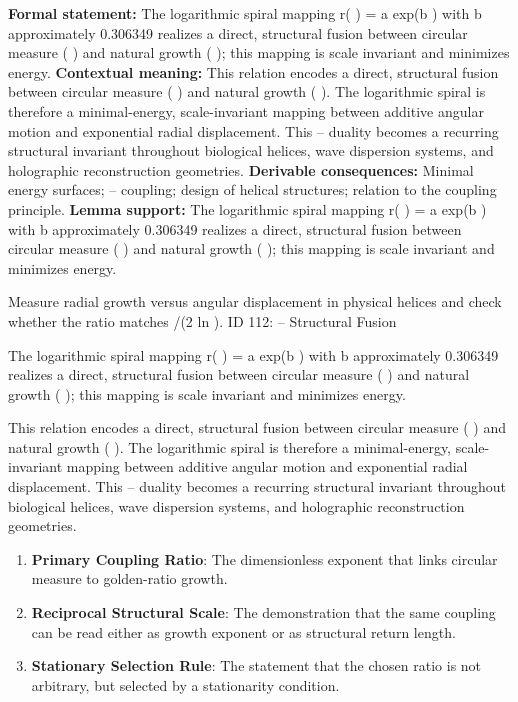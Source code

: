 \begingroup\footnotesize\setlength{\emergencystretch}{3em}\sloppy
\textbf{Formal statement:} The logarithmic spiral mapping r( ) = a exp(b  ) with b approximately 0.306349  realizes a direct, structural fusion between circular measure ( ) and natural growth ( ); this mapping is scale invariant and minimizes energy.
\textbf{Contextual meaning:} This relation encodes a direct, structural fusion between circular measure ( ) and natural growth ( ). The logarithmic spiral is therefore a minimal-energy, scale-invariant mapping between additive angular motion and exponential radial displacement. This  --  duality becomes a recurring structural invariant throughout biological helices, wave dispersion systems, and holographic reconstruction geometries.
\textbf{Derivable consequences:} Minimal energy surfaces;  --  coupling; design of helical structures; relation to the coupling principle.
\textbf{Lemma support:} The logarithmic spiral mapping r( ) = a exp(b  ) with b approximately 0.306349  realizes a direct, structural fusion between circular measure ( ) and natural growth ( ); this mapping is scale invariant and minimizes energy.\par
\endgroup

Measure radial growth versus angular displacement in physical helices and check whether the ratio matches  /(2 ln  ). ID 112:  --  Structural Fusion

The logarithmic spiral mapping r( ) = a exp(b  ) with b approximately 0.306349  realizes a direct, structural fusion between circular measure ( ) and natural growth ( ); this mapping is scale invariant and minimizes energy.

This relation encodes a direct, structural fusion between circular measure ( ) and natural growth ( ). The logarithmic spiral is therefore a minimal-energy, scale-invariant mapping between additive angular motion and exponential radial displacement. This  --  duality becomes a recurring structural invariant throughout biological helices, wave dispersion systems, and holographic reconstruction geometries.
\endgroup

\begin{enumerate}[leftmargin=1.6em,itemsep=6pt,topsep=4pt]
\item \textbf{Primary Coupling Ratio}: The dimensionless exponent that links circular measure to golden-ratio growth.
\item \textbf{Reciprocal Structural Scale}: The demonstration that the same coupling can be read either as growth exponent or as structural return length.
\item \textbf{Stationary Selection Rule}: The statement that the chosen ratio is not arbitrary, but selected by a stationarity condition.
\end{enumerate}

